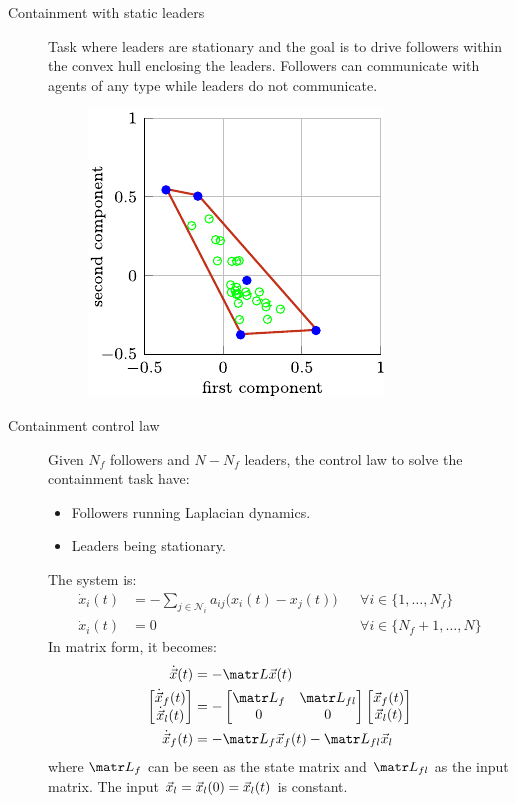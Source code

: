 \begin{description}
    \item[Containment with static leaders] 
        Task where leaders are stationary and the goal is to drive followers within the convex hull enclosing the leaders. Followers can communicate with agents of any type while leaders do not communicate.

        \begin{figure}[H]
            \centering
            \includegraphics[width=0.3\linewidth]{./img/_containment.pdf}
        \end{figure}

    \item[Containment control law] 
        Given $N_f$ followers and $N-N_f$ leaders, the control law to solve the containment task have:
        \begin{itemize}
            \item Followers running Laplacian dynamics.
            \item Leaders being stationary.
        \end{itemize}

        The system is:
        \[
            \begin{aligned}
                \dot{x}_i(t) &= - \sum_{j \in \mathcal{N}_i} a_{ij} \big( x_i(t) - x_j(t) \big) & & \forall i \in \{ 1, \dots, N_f \} \\
                \dot{x}_i(t) &= 0 & & \forall i \in \{ N_f + 1, \dots, N \}
            \end{aligned}
        \]
        In matrix form, it becomes:
        \[
            \begin{split}
                \dot{\x}(t) &= - \lap \x(t) \\
                \begin{bmatrix} \dot{\x}_f(t) \\ \dot{\x}_l(t) \end{bmatrix} &=
                - \begin{bmatrix} \lap_f & \lap_{fl} \\ 0 & 0 \end{bmatrix}
                \begin{bmatrix} \x_f(t) \\ \x_l(t) \end{bmatrix} \\
                \dot{\x}_f(t) &= - \lap_f \x_f(t) - \lap_{fl} \x_l
            \end{split}
        \]
        where $\lap_f$ can be seen as the state matrix and
        $\lap_{fl}$ as the input matrix. The input ${\vec{x}}_l = {\vec{x}}_l(0) = {\vec{x}}_l(t)$ is constant.
\end{description}

